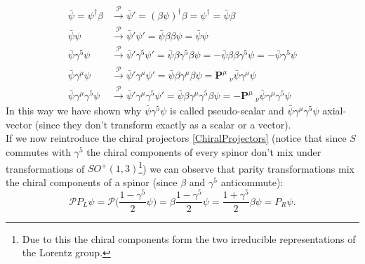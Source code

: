 \begin{align*}
    \bar\psi=\psi^\dagger\beta&\xrightarrow{\mathcal{P} }\bar\psi'=(\beta\psi)^\dagger\beta=\psi^\dagger=\bar\psi\beta\\
    \bar\psi\psi&\xrightarrow{\mathcal{P} }\bar\psi'\psi'=\bar\psi\beta\beta\psi= \bar\psi\psi\\
    \bar\psi\gamma^5\psi&\xrightarrow{\mathcal{P} }\bar\psi'\gamma^5\psi'=\bar\psi\beta\gamma^5\beta\psi=-\bar\psi\beta\beta\gamma^5\psi=-\bar\psi\gamma^5\psi\\\bar\psi\gamma^\mu\psi&\xrightarrow{\mathcal{P} }\bar\psi'\gamma^\mu\psi'=\bar\psi\beta\gamma^\mu\beta\psi=\mathbf{P}  ^\mu\ _\nu\bar\psi\gamma^\mu\psi\\
    \bar\psi\gamma^\mu\gamma^5\psi&\xrightarrow{\mathcal{P} }\bar\psi'\gamma^\mu\gamma^5\psi'=\bar\psi\beta\gamma^\mu\gamma^5\beta\psi=-\mathbf{P}  ^\mu\ _\nu\bar\psi\gamma^\mu\gamma^5\psi
\end{align*}
In this way we have shown why $\bar\psi\gamma^5\psi$ is called pseudo-scalar and $\bar\psi\gamma^\mu\gamma^5\psi$ axial-vector (since they don't transform exactly as a scalar or a vector).\\
If we now reintroduce the chiral projectors \eqref{ChiralProjectors} (notice that since $S$ commutes with $\gamma^5$ the chiral components of every spinor don't mix under transformations of $SO^+(1,3)$\footnote{Due to this the chiral components form  the two irreducible representations of the Lorentz group.}) we can observe that parity transformations mix the chiral components of a spinor (since $\beta$ and $\gamma^5$ anticommute):
\begin{equation*}
    \mathcal{P} P_L\psi=\mathcal{P} \bigg(\frac{1-\gamma^5}{2}\psi\bigg)=\beta\frac{1-\gamma^5}{2}\psi=\frac{1+\gamma^5}{2}\beta\psi=P_R\psi.
\end{equation*}

